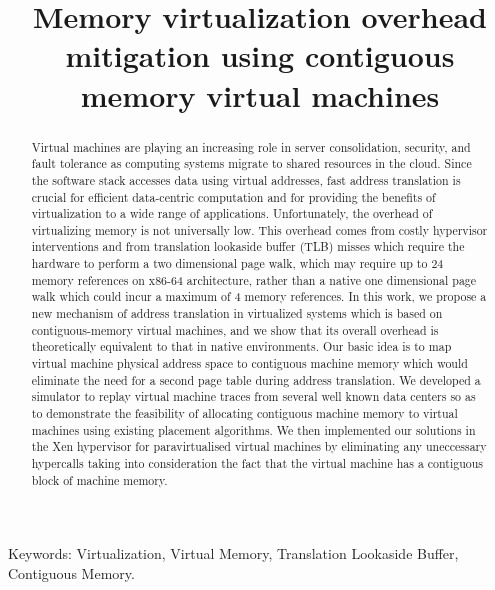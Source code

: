 \documentclass[sigconf]{sigplanconf}
\title{Memory virtualization overhead mitigation using contiguous memory virtual machines}
\begin{document}
   \maketitle  
  
  \begin{abstract}
 Virtual machines are playing an increasing role in server consolidation, security, and fault tolerance as computing systems migrate to shared resources in the cloud. Since the software stack accesses data using virtual addresses, fast address translation is crucial for efficient data-centric computation and for providing the benefits of virtualization to a wide range of applications. Unfortunately, the overhead of virtualizing memory is not universally low. This overhead comes from costly hypervisor interventions and from translation lookaside buffer (TLB) misses which require the hardware to perform a two dimensional page walk, which may require up to 24 memory references on x86-64 architecture, rather than a native one dimensional page walk which could incur a maximum of 4 memory references. In this work, we propose a new mechanism of address translation in virtualized systems which is based on contiguous-memory virtual machines, and we show that its overall overhead is theoretically equivalent to that in native environments. Our basic idea is to map virtual machine physical address space to contiguous machine memory which would eliminate the need for a second page table during address translation. We developed a simulator to replay virtual machine traces from several well known data centers so as to demonstrate the feasibility of allocating contiguous machine memory to virtual machines using existing placement algorithms. We then implemented our solutions in the Xen hypervisor for paravirtualised virtual machines by eliminating any uneccessary hypercalls taking into consideration the fact that the virtual machine has a contiguous block of machine memory.
  \end{abstract}
  
 Keywords: Virtualization, Virtual Memory, Translation Lookaside Buffer, Contiguous Memory.
\end{document}
